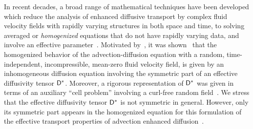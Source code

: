 \documentclass[amsa]{ipart}
\begin{document}
In recent decades, a broad range of mathematical techniques have been
developed
%
%
which reduce the analysis of enhanced diffusive transport by complex
fluid velocity fields with rapidly varying structures in both space
and time, to 
solving averaged or \emph{homogenized} equations that do not have
rapidly varying data, and involve an effective
parameter~\cite{Papanicolaou:1981:36:8,McLaughlin:SIAM_JAM:780,Bensoussan:Book:1978,Biferale:PF:2725,Fannjiang:1994:SIAM_JAM:333,Fannjiang:1997:1033,Mauri:1991:3:743,Pavliotis:PHD_Thesis,Pavliotis:CMS:2007:507,Clark:1998:364,Holmes:1995:94481954,Hornung:1997:9780387947860,Majda:Kramer:1999:book,Majda:1994:10.1088}. Motivated
by~\cite{Papanicolaou:RF-835}, it was
shown~\cite{McLaughlin:SIAM_JAM:780} that the homogenized behavior of
the advection-diffusion equation with a random, time-independent,
incompressible, mean-zero fluid velocity field, is given by an
inhomogeneous diffusion equation involving the symmetric part of an
effective diffusivity tensor $\mathsf{D}^*$. Moreover, a rigorous
representation of $\mathsf{D}^*$ was given in terms of an auxiliary ``cell
problem'' involving a curl-free random
field~\cite{McLaughlin:SIAM_JAM:780}. We stress that the effective
diffusivity tensor $\mathsf{D}^*$ is not symmetric in general. However, only
its symmetric part appears in the homogenized equation for this
formulation of the effective transport properties of advection
enhanced diffusion~\cite{McLaughlin:SIAM_JAM:780}.    
\end{document}
